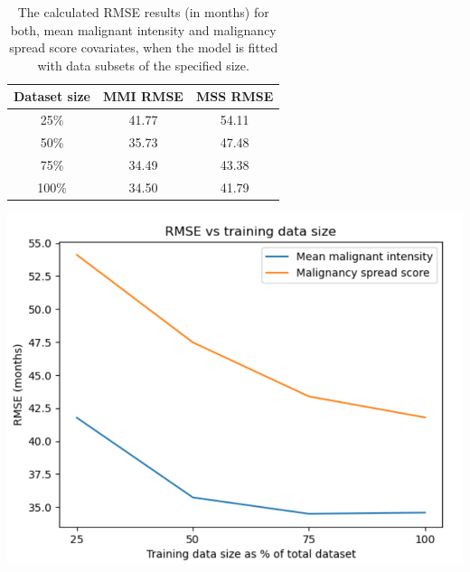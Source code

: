\documentclass{l4proj}
\begin{document}
\begin{table}[ht]
\hspace{-1cm}
\begin{minipage}[b]{0.56\linewidth}
\centering
\begin{tabular}{c|c|c}
    \hline
         Dataset size & MMI RMSE & MSS RMSE  \\ \hline
         25\% & 41.77 & 54.11\\
         50\% & 35.73 & 47.48\\
         75\% & 34.49 & 43.38\\
         100\% & 34.50 & 41.79\\
    \end{tabular}
    \vspace{2cm}
    \caption{The calculated RMSE results (in months) for both, mean malignant intensity and malignancy spread score covariates, when the model is fitted with data subsets of the specified size.}
    \label{tab:datset-size-effect}
\end{minipage}\hfill
\hspace{-2cm}
\begin{minipage}[b]{0.4\linewidth}
\centering
    \includegraphics[scale=0.3]{images/data-size-RMSE.png}
    \label{fig:data-size-RMSE}
\end{minipage}
\end{table}
\end{document}
